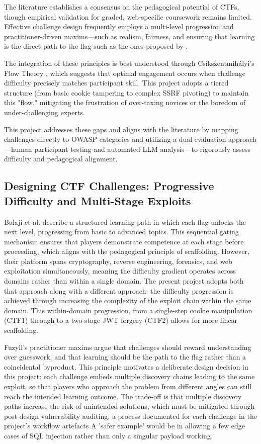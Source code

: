 The literature establishes a consensus on the pedagogical potential of CTFs, though empirical validation for graded, web-specific coursework remains limited. Effective challenge design frequently employs a multi-level progression and practitioner-driven maxims—such as realism, fairness, and ensuring that learning is the direct path to the flag such as the ones proposed by \cite{Balaji2025}.

The integration of these principles is best understood through Csíkszentmihályi’s Flow Theory \cite{Csikszentmihalyi}, which suggests that optimal engagement occurs when challenge difficulty precisely matches participant skill. This project adopts a tiered structure (from basic cookie tampering to complex SSRF pivoting) to maintain this "flow," mitigating the frustration of over-taxing novices or the boredom of under-challenging experts.

This project addresses these gaps and aligns with the literature by mapping challenges directly to OWASP \cite{OWASP2025} categories and utilizing a dual-evaluation approach—human participant testing and automated LLM analysis—to rigorously assess difficulty and pedagogical alignment.



\subsection{Designing CTF Challenges: Progressive Difficulty and Multi-Stage Exploits}
Balaji et al. \cite{Balaji2025} describe a structured learning path in which each flag unlocks the next level, progressing from basic to advanced topics. This sequential gating mechanism ensures that players demonstrate
competence at each stage before proceeding, which aligns with the
pedagogical principle of scaffolding. However, their platform spans
cryptography, reverse engineering, forensics, and web exploitation
simultaneously, meaning the difficulty gradient operates across domains
rather than within a single domain. The present project adopts both that approach along with a
different approach: the difficulty progression is achieved through increasing the complexity of the exploit chain within the same domain. This within-domain
progression, from a single-step cookie manipulation (CTF1) through to a two-stage JWT forgery (CTF2) allows for more linear scaffolding.

Fuzyll's practitioner maxims \cite{Fuzyll2015} argue that challenges should reward
understanding over guesswork, and that learning should be the path to
the flag rather than a coincidental byproduct. This principle motivates
a deliberate design decision in this project: each challenge embeds
multiple discovery chains leading to the same exploit, so that players
who approach the problem from different angles can still reach the
intended learning outcome. The trade-off is that multiple discovery
paths increase the risk of unintended solutions, which must be
mitigated through post-design vulnerability auditing, a process
documented for each challenge in the project's workflow artefacts A 'safer example' would be in allowing a few edge cases of SQL injection rather than only a singular payload working.


